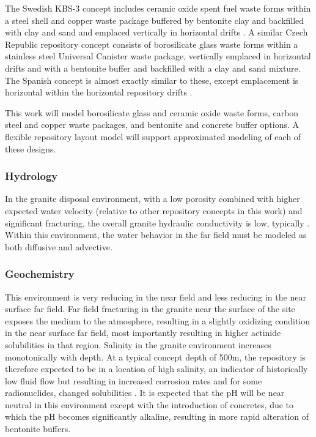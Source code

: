 The Swedish KBS-3 concept includes ceramic oxide spent fuel waste forms within a 
steel shell and copper waste package buffered by bentonite clay and backfilled 
with clay and sand and emplaced vertically in horizontal drifts 
\cite{ab_long-term_2006}.
A similar Czech Republic repository concept consists of 
borosilicate glass waste forms within a stainless steel Universal Canister waste 
package, vertically emplaced in horizontal drifts and with a bentonite buffer  
and backfilled with a clay and sand mixture.
The Spanish concept is almost exactly similar to 
these, except emplacement is horizontal within the horizontal repository drifts
\cite{ von_lensa_red-impact_2008}.



This work  will model borosilicate glass and ceramic oxide waste forms, 
carbon steel and copper waste packages, and bentonite and concrete buffer 
options.  A flexible repository layout model will support approximated modeling
of each of these designs.


\subsubsection{Hydrology}

In the granite disposal environment, with a low porosity combined with 
higher expected water velocity (relative to other repository concepts in this 
work) and significant fracturing, the overall 
granite hydraulic conductivity is low, typically
\cite{schwartz_fundamentals_2004, 
hardin_generic_2011}. Within this environment, the  
water behavior in the far field must be modeled as both diffusive and advective.

\subsubsection{Geochemistry}

This environment is very reducing in the near field and less reducing in the 
near surface far field. Far field fracturing in the granite near the surface 
of the site exposes the medium to the atmosphere, resulting in a slightly 
oxidizing condition in the near surface far field, most importantly resulting 
in higher actinide solubilities in that region. Salinity in the granite 
environment increases monotonically with depth. At a typical concept depth of 
500m, the repository is therefore expected to be in a location of high salinity, 
an indicator of historically low fluid flow but resulting in increased corrosion 
rates and for some radionuclides, changed solubilities \cite{andra_granite:_2005}.
It is expected that the pH will be near neutral in this environment except with  
the introduction of concretes, due to which the pH becomes significantly 
alkaline, resulting in more rapid alteration of bentonite buffers. 

